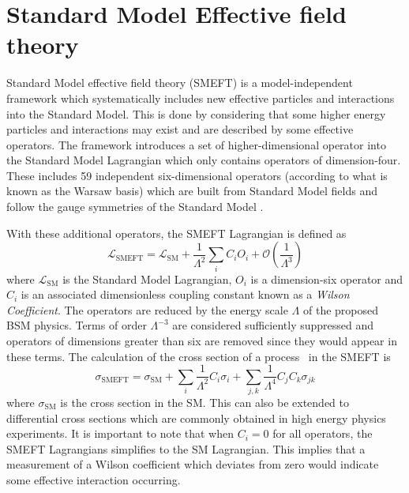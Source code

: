 \documentclass[a4paper,11pt]{article}
\begin{document}
\section{Standard Model Effective field theory}\label{sec:smeft}

\nocite{Zhang2011}
\nocite{franzosi2015probing}

Standard Model effective field theory (SMEFT) is a model-independent framework which systematically includes new effective particles and interactions into the Standard Model.
This is done by considering that some higher energy particles and interactions may exist and are described by some effective operators.
The framework introduces a set of higher-dimensional operator into the Standard Model Lagrangian which only contains operators of dimension-four.
These includes 59 independent six-dimensional operators (according to what is known as the Warsaw basis) which are built from Standard Model fields and follow the gauge symmetries of the Standard Model \cite{Grzadkowski_2010}.

With these additional operators, the SMEFT Lagrangian is defined as
\begin{equation}\label{eq:smeft_lagrangian}
    \mathcal{L}_{\text{SMEFT}} = \mathcal{L}_{\text{SM}} + \frac{1}{\Lambda^2} \sum\limits_{i} C_{i} O_{i} + \mathcal{O}\left(\frac{1}{\Lambda^3}\right)
\end{equation}
where $\mathcal{L}_{\text{SM}}$ is the Standard Model Lagrangian, $O_{i}$ is a dimension-six operator and $C_{i}$ is an associated dimensionless coupling constant known as a \emph{Wilson Coefficient}.
The operators are reduced by the energy scale $\Lambda$ of the proposed BSM physics.
Terms of order $\Lambda^{-3}$ are considered sufficiently suppressed and operators of dimensions greater than six are removed since they would appear in these terms.
The calculation of the cross section of a process~\cite{Hartland_2019} in the SMEFT is
\begin{equation}\label{eq:smeft_cross_section}
    \sigma_{\text{SMEFT}} = \sigma_{\text{SM}} + \sum\limits_{i} \frac{1}{\Lambda^2} C_{i} \sigma_{i} + \sum\limits_{j,k} \frac{1}{\Lambda^4} C_{j} C_{k} \sigma_{j k}
\end{equation}
where $\sigma_{\text{SM}}$ is the cross section in the SM. This can also be extended to differential cross sections which are commonly obtained in high energy physics experiments.
It is important to note that when $C_{i}=0$ for all operators, the SMEFT Lagrangians simplifies to the SM Lagrangian.
This implies that a measurement of a Wilson coefficient which deviates from zero would indicate some effective interaction occurring.
\end{document}
